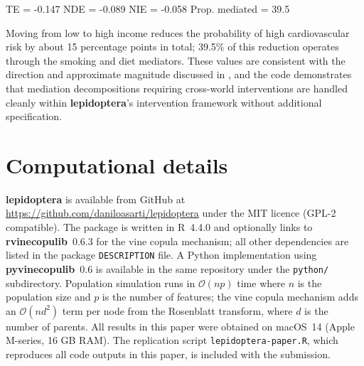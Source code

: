 \documentclass[12pt]{article}
\newcommand{\pkg}[1]{\textbf{#1}}
\newcommand{\proglang}[1]{\textsf{#1}}
\newcommand{\code}[1]{\texttt{#1}}
\begin{document}

\begin{CodeOutput}
TE = -0.147  NDE = -0.089  NIE = -0.058  Prop. mediated = 39.5%
\end{CodeOutput}

\noindent
Moving from low to high income reduces the probability of high cardiovascular risk
by about 15 percentage points in total; 39.5\% of this reduction operates through
the smoking and diet mediators. These values are consistent with the direction and
approximate magnitude discussed in \citet{vanderweele2015explanation}, and the
code demonstrates that mediation decompositions requiring cross-world interventions
are handled cleanly within \pkg{lepidoptera}'s intervention framework without
additional specification.

\section{Computational details}
\label{sec:computational}

\pkg{lepidoptera} is available from GitHub at
\url{https://github.com/daniloasarti/lepidoptera} under the MIT licence (GPL-2
compatible). The package is written in \proglang{R}~4.4.0
\citep{rcore2024} and optionally links to \pkg{rvinecopulib}~0.6.3
\citep{nagler2022rvinecopulib} for the vine copula mechanism; all other
dependencies are listed in the package \code{DESCRIPTION} file. A
\proglang{Python} implementation using \pkg{pyvinecopulib}~0.6
\citep{pyvinecopulib2024} is available in the same repository under the
\code{python/} subdirectory. Population simulation runs in
$(np)$ time
where $n$ is the population size and $p$ is the number of features; the vine
copula mechanism adds an $(n d^2)$ term per node from the Rosenblatt
transform, where $d$ is the number of parents. All results in this paper were
obtained on macOS~14 (Apple M-series, 16 GB RAM). The replication script
\code{lepidoptera-paper.R}, which reproduces all code outputs in this paper, is
included with the submission.
\end{document}
